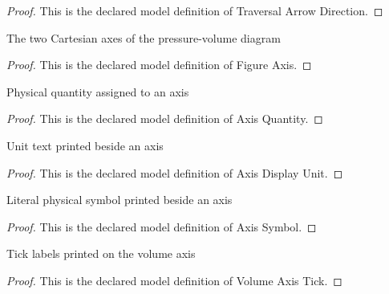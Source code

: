 \begin{proof}
  This is the declared model definition of Traversal Arrow Direction.
\end{proof}
\begin{definition}
  \label{def:physics:phyx-mini-0421:phyxminiproblems-problemphyxmini0421-figureaxis}
  The two Cartesian axes of the pressure-volume diagram
\end{definition}
\begin{proof}
  This is the declared model definition of Figure Axis.
\end{proof}
\begin{definition}
  \label{def:physics:phyx-mini-0421:phyxminiproblems-problemphyxmini0421-axisquantity}
  Physical quantity assigned to an axis
\end{definition}
\begin{proof}
  This is the declared model definition of Axis Quantity.
\end{proof}
\begin{definition}
  \label{def:physics:phyx-mini-0421:phyxminiproblems-problemphyxmini0421-axisdisplayunit}
  Unit text printed beside an axis
\end{definition}
\begin{proof}
  This is the declared model definition of Axis Display Unit.
\end{proof}
\begin{definition}
  \label{def:physics:phyx-mini-0421:phyxminiproblems-problemphyxmini0421-axissymbol}
  Literal physical symbol printed beside an axis
\end{definition}
\begin{proof}
  This is the declared model definition of Axis Symbol.
\end{proof}
\begin{definition}
  \label{def:physics:phyx-mini-0421:phyxminiproblems-problemphyxmini0421-volumeaxistick}
  Tick labels printed on the volume axis
\end{definition}
\begin{proof}
  This is the declared model definition of Volume Axis Tick.
\end{proof}
